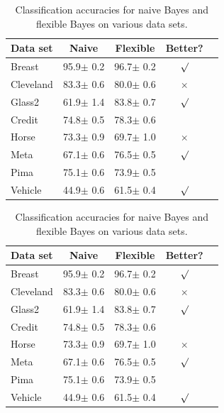 \documentclass{article}
\begin{document}
\begin{table}[t]
	\caption{Classification accuracies for naive Bayes and flexible
		Bayes on various data sets.}
	\label{sample-table}
	\vskip 0.15in
	\begin{center}
		\begin{small}
			\begin{sc}
				\begin{tabular}{lcccr}
					\toprule
					Data set & Naive & Flexible & Better? \\
					\midrule
					Breast    & 95.9$\pm$ 0.2& 96.7$\pm$ 0.2& $\surd$ \\
					Cleveland & 83.3$\pm$ 0.6& 80.0$\pm$ 0.6& $\times$\\
					Glass2    & 61.9$\pm$ 1.4& 83.8$\pm$ 0.7& $\surd$ \\
					Credit    & 74.8$\pm$ 0.5& 78.3$\pm$ 0.6&         \\
					Horse     & 73.3$\pm$ 0.9& 69.7$\pm$ 1.0& $\times$\\
					Meta      & 67.1$\pm$ 0.6& 76.5$\pm$ 0.5& $\surd$ \\
					Pima      & 75.1$\pm$ 0.6& 73.9$\pm$ 0.5&         \\
					Vehicle   & 44.9$\pm$ 0.6& 61.5$\pm$ 0.4& $\surd$ \\
					\bottomrule
				\end{tabular}
			\end{sc}
		\end{small}
	\end{center}
	\vskip -0.1in
\end{table}


\begin{table}[t]
	\caption{Classification accuracies for naive Bayes and flexible
		Bayes on various data sets.}
	\label{sample-table}
	\vskip 0.15in
	\begin{center}
		\begin{small}
			\begin{sc}
				\begin{tabular}{lcccr}
					\toprule
					Data set & Naive & Flexible & Better? \\
					\midrule
					Breast    & 95.9$\pm$ 0.2& 96.7$\pm$ 0.2& $\surd$ \\
					Cleveland & 83.3$\pm$ 0.6& 80.0$\pm$ 0.6& $\times$\\
					Glass2    & 61.9$\pm$ 1.4& 83.8$\pm$ 0.7& $\surd$ \\
					Credit    & 74.8$\pm$ 0.5& 78.3$\pm$ 0.6&         \\
					Horse     & 73.3$\pm$ 0.9& 69.7$\pm$ 1.0& $\times$\\
					Meta      & 67.1$\pm$ 0.6& 76.5$\pm$ 0.5& $\surd$ \\
					Pima      & 75.1$\pm$ 0.6& 73.9$\pm$ 0.5&         \\
					Vehicle   & 44.9$\pm$ 0.6& 61.5$\pm$ 0.4& $\surd$ \\
					\bottomrule
				\end{tabular}
			\end{sc}
		\end{small}
	\end{center}
	\vskip -0.1in
\end{table}
\end{document}
